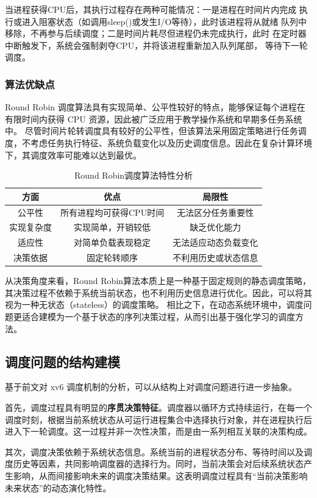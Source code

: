 当进程获得CPU后，其执行过程存在两种可能情况：一是进程在时间片内完成
执行或进入阻塞状态（如调用sleep()或发生I/O等待），此时该进程将从就绪
队列中移除，不再参与后续调度；二是时间片耗尽但进程仍未完成执行，此时
在定时器中断触发下，系统会强制剥夺CPU，并将该进程重新加入队列尾部，
等待下一轮调度。

\subsubsection{算法优缺点}
Round Robin 调度算法具有实现简单、公平性较好的特点，能够保证每个进程在有限时间内获得 CPU 资源，因此被广泛应用于教学操作系统和早期多任务系统中。
尽管时间片轮转调度具有较好的公平性，但该算法采用固定策略进行任务调度，不考虑任务执行特征、系统负载变化以及历史调度信息。因此在复杂计算环境下，其调度效率可能难以达到最优。
\begin{table}[htbp]
\centering
\caption{Round Robin调度算法特性分析}
\begin{tabular}{ccc}
\hline
方面 & 优点 & 局限性 \\
\hline
公平性 & 所有进程均可获得CPU时间 & 无法区分任务重要性 \\
实现复杂度 & 实现简单，开销较低 & 缺乏优化能力 \\
适应性 & 对简单负载表现稳定 & 无法适应动态负载变化 \\
决策依据 & 固定轮转顺序 & 不利用历史或状态信息 \\
\hline
\end{tabular}
\end{table}

从决策角度来看，Round Robin算法本质上是一种基于固定规则的静态调度策略，其决策过程不依赖于系统当前状态，也不利用历史信息进行优化。因此，可以将其视为一种无状态（stateless）的调度策略。
相比之下，在动态系统环境中，调度问题更适合建模为一个基于状态的序列决策过程，从而引出基于强化学习的调度方法。

\subsection{调度问题的结构建模}
基于前文对 xv6 调度机制的分析，可以从结构上对调度问题进行进一步抽象。

首先，调度过程具有明显的\textbf{序贯决策特征}。调度器以循环方式持续运行，在每一个调度时刻，根据当前系统状态从可运行进程集合中选择执行对象，并在进程执行后进入下一轮调度。这一过程并非一次性决策，而是由一系列相互关联的决策构成。

其次，调度决策依赖于系统状态信息。系统当前的进程状态分布、等待时间以及调度历史等因素，共同影响调度器的选择行为。同时，当前决策会对后续系统状态产生影响，从而间接影响未来的调度决策结果。这表明调度过程具有“当前决策影响未来状态”的动态演化特性。

